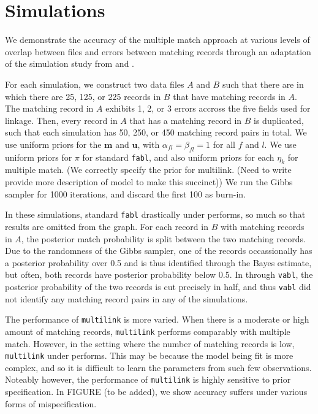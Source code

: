 \documentclass[12pt,letterpaper]{article}
\newcommand{\1}[1]{\mathbb{I}\!\left[#1\right]} %
\def \brian#1{{\color{red} (#1)}}
\begin{document}
\section{Simulations}

We demonstrate the accuracy of the multiple match approach at various levels of overlap between files and errors between matching records through an adaptation of the simulation study from \cite{sadinle_bayesian_2017} and \cite{kundinger_2023}. 

For each simulation, we construct two data files $A$ and $B$ such that there are in which there are 25, 125, or 225 records in $B$ that have matching records in $A$. The matching record in $A$ exhibits 1, 2, or 3 errors accross the five fields used for linkage. Then, every record in $A$ that has a matching record in $B$ is duplicated, such that each simulation has 50, 250, or 450 matching record pairs in total. We use uniform priors for the $\bm{m}$ and $\bm{u}$, with $\alpha_{fl} = \beta_{fl} = 1$ for all $f$ and $l$. We use uniform priors for $\pi$ for standard \texttt{fabl}, and also uniform priors for each $\eta_k$ for multiple match. \brian{We correctly specify the prior for multilink. (Need to write provide more description of model to make this succinct)} We run the Gibbs sampler for 1000 iterations, and discard the first 100 as burn-in.

In these simulations, standard \texttt{fabl} drastically under performs, so much so that results are omitted from the graph. For each record in $B$ with matching records in $A$, the posterior match probability is split between the two matching records. Due to the randomness of the Gibbs sampler, one of the records occassionally has a posterior probability over 0.5 and is thus identified through the Bayes estimate, but often, both records have posterior probability below 0.5. In through \texttt{vabl}, the posterior probability of the two records is cut precisely in half, and thus \texttt{vabl} did not identify any matching record pairs in any of the simulations.

The performance of \texttt{multilink} is more varied. When there is a moderate or high amount of matching records, \texttt{multilink} performs comparably with multiple match. However, in the setting where the number of matching records is low, \texttt{multilink} under performs. This may be because the model being fit is more complex, and so it is difficult to learn the parameters from such few observations. Noteably however, the performance of \texttt{multilink} is highly sensitive to prior specification. In FIGURE (to be added), we show accuracy suffers under various forms of mispecification.
\end{document}
